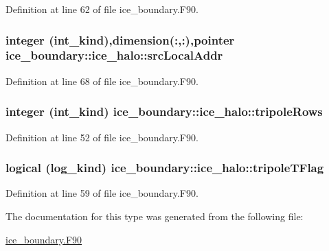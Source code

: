 Definition at line 62 of file ice\_\-boundary.F90.\hypertarget{typeice__boundary_1_1ice__halo_a396d5672cdeedfc9fb66749bce9654b9}{
\subsubsection[{srcLocalAddr}]{\setlength{\rightskip}{0pt plus 5cm}integer (int\_\-kind),dimension(:,:),pointer {\bf ice\_\-boundary::ice\_\-halo::srcLocalAddr}}}
\label{typeice__boundary_1_1ice__halo_a396d5672cdeedfc9fb66749bce9654b9}


Definition at line 68 of file ice\_\-boundary.F90.\hypertarget{typeice__boundary_1_1ice__halo_aa99a48d3d59fc70b1260a1f267b752f2}{
\subsubsection[{tripoleRows}]{\setlength{\rightskip}{0pt plus 5cm}integer (int\_\-kind) {\bf ice\_\-boundary::ice\_\-halo::tripoleRows}}}
\label{typeice__boundary_1_1ice__halo_aa99a48d3d59fc70b1260a1f267b752f2}


Definition at line 52 of file ice\_\-boundary.F90.\hypertarget{typeice__boundary_1_1ice__halo_adc7cf6a34ad3e931ddbded6ef57b5d1d}{
\subsubsection[{tripoleTFlag}]{\setlength{\rightskip}{0pt plus 5cm}logical (log\_\-kind) {\bf ice\_\-boundary::ice\_\-halo::tripoleTFlag}}}
\label{typeice__boundary_1_1ice__halo_adc7cf6a34ad3e931ddbded6ef57b5d1d}


Definition at line 59 of file ice\_\-boundary.F90.

The documentation for this type was generated from the following file:\begin{DoxyCompactItemize}
\item 
\hyperlink{ice__boundary_8F90}{ice\_\-boundary.F90}\end{DoxyCompactItemize}
